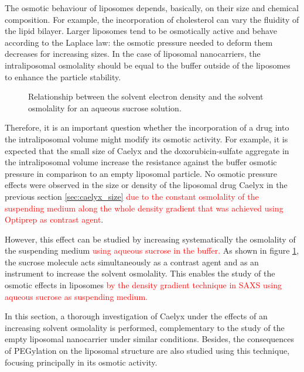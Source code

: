 The osmotic behaviour of liposomes depends, basically, on their size and chemical composition. For example, the incorporation of cholesterol can vary the fluidity of the lipid bilayer. Larger liposomes tend to be osmotically active \citep{de_gier_osmotic_1993} and behave according to the Laplace law: the osmotic pressure needed to deform them decreases for increasing sizes. In the case of liposomal nanocarriers, the intraliposomal osmolality should be equal to the buffer outside of the liposomes to enhance the particle stability. 

\begin{figure}
	\centering
		{\resizebox{0.8\linewidth}{!}{\figfont{12pt}}}
		\caption[Relationship between the solvent electron density and the solvent osmolality for an aqueous sucrose solution.]{Relationship between the solvent electron density and the solvent osmolality for an aqueous sucrose solution.}
		\label{fig:OsmolalityElectronDensity}
\end{figure}

Therefore, it is an important question whether the incorporation of a drug into the intraliposomal volume might modify its osmotic activity. For example, it is expected that the small size of Caelyx and the doxorubicin-sulfate aggregate in the intraliposomal volume increase the resistance against the buffer osmotic pressure in comparison to an empty liposomal particle.  No osmotic pressure effects were observed in the size or density of the liposomal drug Caelyx in the previous section \ref{sec:caelyx_size} \textcolor{red}{due to the constant osmolality of the suspending medium along the whole density gradient that was achieved using Optiprep as contrast agent}.

However, this effect can be studied by increasing systematically the osmolality of the suspending medium \textcolor{red}{using aqueous sucrose in the buffer.} As shown in figure \ref{fig:OsmolalityElectronDensity}, the sucrose molecule acts simultaneously as a contrast agent and as an instrument to increase the solvent osmolality. This enables the study of the osmotic effects in liposomes \textcolor{red}{by the density gradient technique in SAXS using aqueous sucrose as suspending medium.}

In this section, a thorough investigation of Caelyx under the effects of an increasing solvent osmolality is performed, complementary to the study of the empty liposomal nanocarrier under similar conditions. Besides, the consequences of PEGylation on the liposomal structure are also studied using this technique, focusing principally in its osmotic activity. 


